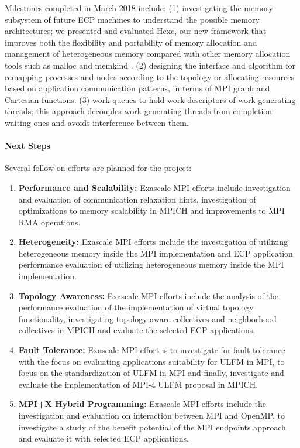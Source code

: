 Milestones completed in March 2018 include: (1) investigating the
memory subsystem of future ECP machines to understand the possible
memory architectures; we presented and evaluated Hexe, our new
framework that improves both the flexibility and portability of memory
allocation and management of heterogeneous memory compared with other
memory allocation tools such as malloc and memkind \cite{hexe}.  (2)
designing the interface and algorithm for remapping processes and
nodes according to the topology or allocating resources based on
application communication patterns, in terms of MPI graph and
Cartesian functions.  (3) work-queues to hold work descriptors of
work-generating threads; this approach decouples work-generating
threads from completion-waiting ones and avoids interference between
them.

\paragraph{Next Steps}

Several follow-on efforts are planned for the project:

\begin{enumerate}

\item \textbf{Performance and Scalability:} Exascale MPI efforts
  include investigation and evaluation of communication relaxation
  hints, investigation of optimizations to memory scalability in MPICH
  and improvements to MPI RMA operations.
	
\item \textbf{Heterogeneity:} Exascale MPI efforts include the
  investigation of utilizing heterogeneous memory inside the MPI
  implementation and ECP application performance evaluation of
  utilizing heterogeneous memory inside the MPI implementation.
	
\item \textbf{Topology Awareness:} Exascale MPI efforts include the
  analysis of the performance evaluation of the implementation of
  virtual topology functionality, investigating topology-aware
  collectives and neighborhood collectives in MPICH and evaluate the
  selected ECP applications.
	
\item \textbf{Fault Tolerance:} Exascale MPI effort is to investigate
  for fault tolerance with the focus on evaluating applications
  suitability for ULFM in MPI, to focus on the standardization of ULFM
  in MPI and finally, investigate and evaluate the implementation of
  MPI-4 ULFM proposal in MPICH.
	
\item \textbf{MPI+X Hybrid Programming:} Exascale MPI efforts include
  the investigation and evaluation on interaction between MPI and
  OpenMP, to investigate a study of the benefit potential of the MPI
  endpoints approach and evaluate it with selected ECP applications.

\end{enumerate}
